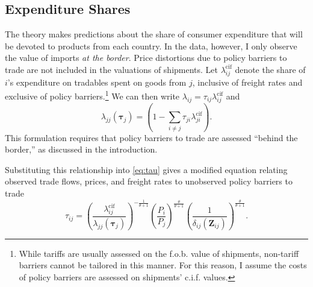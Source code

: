 \documentclass{puthesis}
\begin{document}
\subsection{Expenditure Shares}

The theory makes predictions about the share of consumer expenditure
that will be devoted to products from each country. In the data,
however, I only observe the value of imports \emph{at the border}. Price
distortions due to policy barriers to trade are not included in the
valuations of shipments. Let \(\lambda_{ij}^{\text{cif}}\) denote the
share of \(i\)'s expenditure on tradables spent on goods from \(j\),
inclusive of freight rates and exclusive of policy barriers.\footnote{While
  tariffs are usually assessed on the f.o.b. value of shipments,
  non-tariff barriers cannot be tailored in this manner. For this
  reason, I assume the costs of policy barriers are assessed on
  shipments' c.i.f. values.} We can then write
\(\lambda_{ij} = \tau_{ij} \lambda_{ij}^{\text{cif}}\) and
\begin{equation} \label{eq:lambda_jj}
\lambda_{jj}(\bm{\tau}_j) = \left( 1 - \sum_{i \neq j} \tau_{ji} \lambda_{ji}^{\text{cif}} \right) .
\end{equation} This formulation requires that policy barriers to trade
are assessed ``behind the border,'' as discussed in the introduction.

Substituting this relationship into \ref{eq:tau} gives a modified
equation relating observed trade flows, prices, and freight rates to
unobserved policy barriers to trade \begin{equation} \label{eq:tauCIF}
\tau_{ij} = \left( \frac{\lambda_{ij}^{\text{cif}}}{\lambda_{jj}(\bm{\tau}_j)} \right)^{-\frac{1}{\theta + 1}} \left( \frac{P_i}{P_j} \right)^{\frac{\theta}{\theta+1}} \left( \frac{1}{\delta_{ij}(\bm{Z}_{ij})} \right)^{\frac{\theta}{\theta+1}} .
\end{equation}
\end{document}
